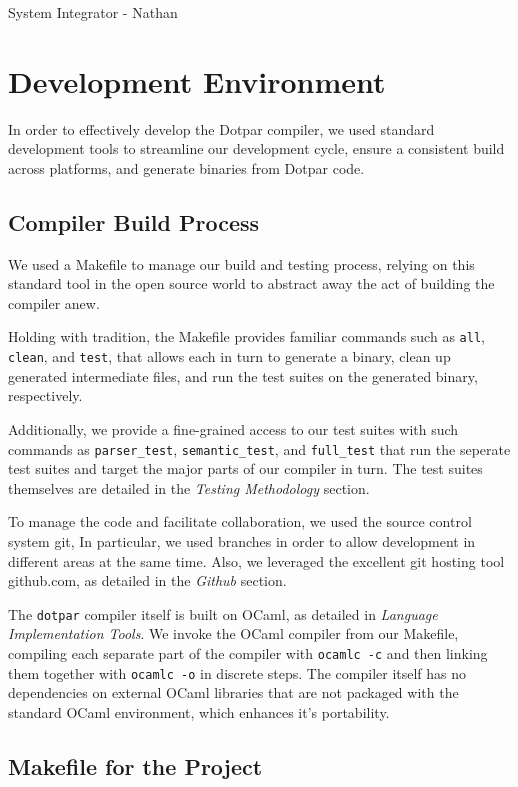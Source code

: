 System Integrator - Nathan

\section{Development Environment}

In order to effectively develop the Dotpar compiler, we used standard
development tools to streamline our development cycle, ensure a
consistent build across platforms, and generate binaries from Dotpar
code.

\subsection{Compiler Build Process}

We used a Makefile to manage our build and testing process, relying on
this standard tool in the open source world to abstract away the act
of building the compiler anew.

Holding with tradition, the Makefile provides familiar commands such
as \texttt{all}, \texttt{clean}, and \texttt{test}, that allows each in turn to
generate a binary, clean up generated intermediate files, and run the
test suites on the generated binary, respectively. 

Additionally, we provide a fine-grained access to our test suites
with such commands as \texttt{parser\_test}, \texttt{semantic\_test},
and \texttt{full\_test} that run the seperate test suites and target
the major parts of our compiler in turn. The test suites themselves
are detailed in the \emph{Testing Methodology} section.

To manage the code and facilitate collaboration, we used the source
control system git, In particular, we 
used branches in order to allow development in different areas at the
same time. Also, we leveraged the excellent git hosting tool
github.com, as detailed in the \emph{Github} section.

The \texttt{dotpar} compiler itself is built on OCaml, as detailed in
\emph{Language Implementation Tools}. We invoke the OCaml compiler from our Makefile, compiling each separate part of the compiler with
\texttt{ocamlc -c} and then linking them together with \texttt{ocamlc
  -o} in discrete steps. The compiler itself has no dependencies on
external OCaml libraries that are not packaged with the standard OCaml
environment, which enhances it's portability.

\subsection{Makefile for the Project}

